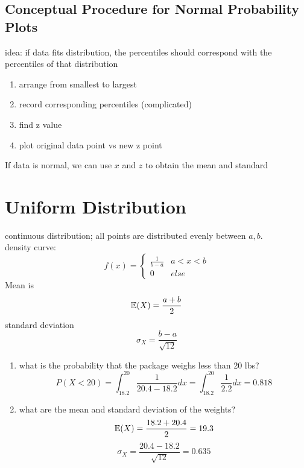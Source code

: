 \subsection{Conceptual Procedure for Normal Probability Plots}  %
idea: if data fits distribution, the percentiles should correspond with the percentiles of that distribution
\begin{enumerate}
    \item arrange from smallest to largest
    \item record corresponding percentiles (complicated)
    \item find z value
    \item plot original data point vs new z point
\end{enumerate}
If data is normal, we can use \(x\) and \(z\) to obtain the mean and standard

\section{Uniform Distribution}  %
continuous distribution; all points are distributed evenly between $a, b$. \\
density curve:
\begin{equation}
    f(x) = \begin{cases}
           \frac{1}{b-a} & a<x<b\\
           0 & else
        \end{cases}
\end{equation}
Mean is\begin{equation}
    \mathbb{E}(X)=\frac{a+b}{2}
\end{equation}
standard deviation \begin{equation}
    \sigma_X=\frac{b-a}{\sqrt{12}}
\end{equation}
\begin{enumerate}
    \item what is the probability that the package weighs less than 20 lbs? \begin{equation}
        P(X<20)=\int_{18.2}^{20}\frac{1}{20.4-18.2}dx=\int_{18.2}^{20}\frac{1}{2.2}dx=0.818
    \end{equation}
    \item what are the mean and standard deviation of the weights?\begin{equation}
        \mathbb{E}(X)=\frac{18.2+20.4}{2}=19.3
    \end{equation}\begin{equation}
        \sigma_X=\frac{20.4-18.2}{\sqrt{12}}=0.635
    \end{equation}
\end{enumerate}

